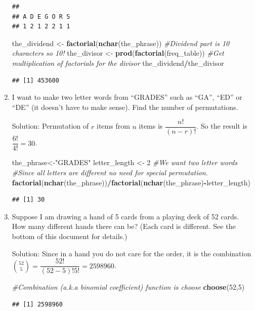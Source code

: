 \documentclass[]{book}
\newenvironment{Shaded}{\begin{snugshade}}{\end{snugshade}}
\newcommand{\CommentTok}[1]{\textcolor[rgb]{0.56,0.35,0.01}{\textit{#1}}}
\newcommand{\DecValTok}[1]{\textcolor[rgb]{0.00,0.00,0.81}{#1}}
\newcommand{\KeywordTok}[1]{\textcolor[rgb]{0.13,0.29,0.53}{\textbf{#1}}}
\newcommand{\NormalTok}[1]{#1}
\newcommand{\OperatorTok}[1]{\textcolor[rgb]{0.81,0.36,0.00}{\textbf{#1}}}
\newcommand{\StringTok}[1]{\textcolor[rgb]{0.31,0.60,0.02}{#1}}
\theoremstyle{definition}
\theoremstyle{definition}
\theoremstyle{definition}
\theoremstyle{remark}
\begin{document}
\begin{enumerate}
\begin{verbatim}
## 
## A D E G O R S 
## 1 2 1 2 2 1 1
\end{verbatim}

\begin{Shaded}
\begin{Highlighting}[]
\NormalTok{the_dividend <-}\StringTok{ }\KeywordTok{factorial}\NormalTok{(}\KeywordTok{nchar}\NormalTok{(the_phrase))  }\CommentTok{#Dividend part is 10 characters so 10!}
\NormalTok{the_divisor <-}\StringTok{ }\KeywordTok{prod}\NormalTok{(}\KeywordTok{factorial}\NormalTok{(freq_table))  }\CommentTok{#Get multiplication of factorials for the divisor}
\NormalTok{the_dividend}\OperatorTok{/}\NormalTok{the_divisor}
\end{Highlighting}
\end{Shaded}

\begin{verbatim}
## [1] 453600
\end{verbatim}
\item
  I want to make two letter words from ``GRADES'' such as ``GA'', ``ED''
  or ``DE'' (it doesn't have to make sense). Find the number of
  permutations.

  Solution: Permutation of \(r\) items from \(n\) items is
  \(\dfrac{n!}{(n-r)!}\). So the result is \(\dfrac{6!}{4!} = 30\).

\begin{Shaded}
\begin{Highlighting}[]
\NormalTok{the_phrase<-}\StringTok{"GRADES"}
\NormalTok{letter_length <-}\StringTok{ }\DecValTok{2} \CommentTok{#We want two letter words}
\CommentTok{#Since all letters are different no need for special permutation.}
\KeywordTok{factorial}\NormalTok{(}\KeywordTok{nchar}\NormalTok{(the_phrase))}\OperatorTok{/}\KeywordTok{factorial}\NormalTok{(}\KeywordTok{nchar}\NormalTok{(the_phrase)}\OperatorTok{-}\NormalTok{letter_length)}
\end{Highlighting}
\end{Shaded}

\begin{verbatim}
## [1] 30
\end{verbatim}
\item
  Suppose I am drawing a hand of 5 cards from a playing deck of 52
  cards. How many different hands there can be? (Each card is different.
  See the bottom of this document for details.)

  Solution: Since in a hand you do not care for the order, it is the
  combination \(\binom{52}{5} = \dfrac{52!}{(52-5)!5!} = 2598960\).

\begin{Shaded}
\begin{Highlighting}[]
\CommentTok{#Combination (a.k.a binomial coefficient) function is choose}
\KeywordTok{choose}\NormalTok{(}\DecValTok{52}\NormalTok{,}\DecValTok{5}\NormalTok{)}
\end{Highlighting}
\end{Shaded}

\begin{verbatim}
## [1] 2598960
\end{verbatim}
\end{enumerate}
\end{document}
